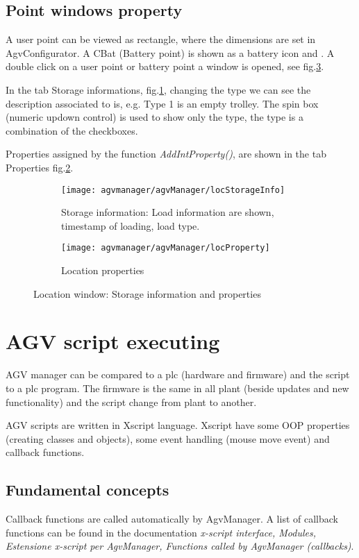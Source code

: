 \subsection{Point windows property}
A user point can be viewed as rectangle, where the dimensions are set in AgvConfigurator. A CBat (Battery point) is shown as a battery icon and . A double click on a user point or battery point a window is opened, see fig.\ref{fig:refLocation}.

In the tab Storage informations, fig.\ref{fig:refLocStorageInfo}, changing the type we can see the description associated to is, e.g. Type 1 is an empty trolley. The spin box (numeric updown control) is used to show only the type, the type is a combination of the checkboxes.

Properties assigned by the function \textit{AddIntProperty()}, are shown in the tab Properties fig.\ref{fig:refLocationProperties}.

\begin{figure}[h]
	\centering
	\begin{subfigure}[b]{0.5\textwidth}
		\texttt{[image: agvmanager/agvManager/locStorageInfo]}
		\caption{Storage information: Load information are shown, timestamp of loading, load type.}
		\label{fig:refLocStorageInfo}
	\end{subfigure}
	\quad
	\begin{subfigure}[b]{0.5\textwidth}
		\texttt{[image: agvmanager/agvManager/locProperty]}
		\caption{Location properties}
		\label{fig:refLocationProperties}
	\end{subfigure}
	\caption{Location window: Storage information and properties}\label{fig:refLocation}
\end{figure}

\section{AGV script executing}
AGV manager can be compared to a plc (hardware and firmware) and the script to a plc program. The firmware is the same in all plant (beside updates and new functionality) and the script change from plant to another.

AGV scripts are written in Xscript language. Xscript have some OOP properties (creating classes and objects), some event handling (mouse move event) and callback functions.

\subsection{Fundamental concepts}
Callback functions are called automatically by AgvManager. A list of callback functions can be found in the documentation \textit{x-script interface, Modules, Estensione x-script per AgvManager, Functions called by AgvManager (callbacks)}.

